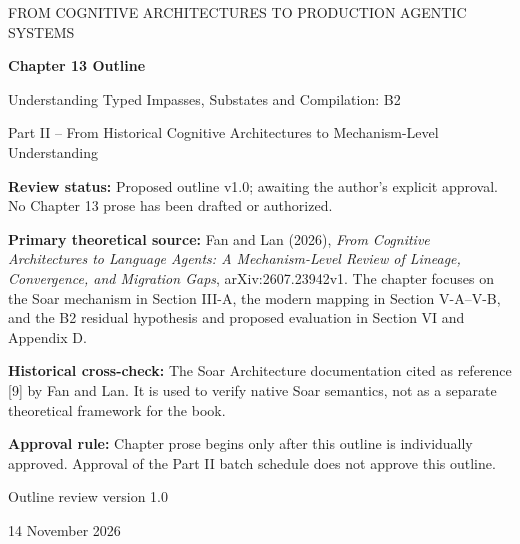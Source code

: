 


\thispagestyle{empty}
\begin{center}
{\sffamily\Large\color{BookBlue} FROM COGNITIVE ARCHITECTURES TO PRODUCTION AGENTIC SYSTEMS\par}
\vspace{1.2cm}
{\sffamily\huge\bfseries\color{BookBlue} Chapter 13 Outline\par}
\vspace{0.45cm}
{\sffamily\LARGE Understanding Typed Impasses, Substates and Compilation: B2\par}
\vspace{0.8cm}
{\large Part II -- From Historical Cognitive Architectures to Mechanism-Level Understanding\par}
\vfill
\begin{notebox}
\textbf{Review status:} Proposed outline v1.0; awaiting the author's explicit approval. No Chapter 13 prose has been drafted or authorized.

\textbf{Primary theoretical source:} Fan and Lan (2026), \emph{From Cognitive Architectures to Language Agents: A Mechanism-Level Review of Lineage, Convergence, and Migration Gaps}, arXiv:2607.23942v1. The chapter focuses on the Soar mechanism in Section III-A, the modern mapping in Section V-A--V-B, and the B2 residual hypothesis and proposed evaluation in Section VI and Appendix D.

\textbf{Historical cross-check:} The Soar Architecture documentation cited as reference [9] by Fan and Lan. It is used to verify native Soar semantics, not as a separate theoretical framework for the book.

\textbf{Approval rule:} Chapter prose begins only after this outline is individually approved. Approval of the Part II batch schedule does not approve this outline.
\end{notebox}
\vfill
{\sffamily\large Outline review version 1.0\par}
{\small 14 November 2026\par}
\end{center}
\clearpage
\setcounter{secnumdepth}{0}
\tableofcontents
\cleardoublepage

\cleardoublepage
\printbibliography[heading=bibintoc,title={Historical mechanism cross-check}]

